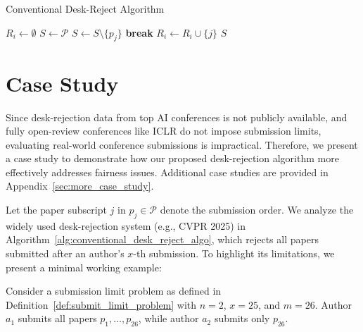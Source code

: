 \begin{algorithm}[!ht]
\caption{Conventional Desk-Reject Algorithm}
\label{alg:conventional_desk_reject_algo}
\begin{algorithmic}[1]

\State $R_i \gets \emptyset$
\EndFor
{}
\State $S \gets \mathcal{P}$
\State $S \gets S \setminus \{p_j\}$
\State \textbf{break}
\EndIf
\EndFor
{}
\State $R_i \gets R_i \cup \{ j \}$
\EndFor
\EndIf
\EndFor
\State \Return $S$
\EndProcedure
\end{algorithmic}
\end{algorithm}

\section{Case Study}\label{sec:case_study}

Since desk-rejection data from top AI conferences is not publicly available, and fully open-review conferences like ICLR do not impose submission limits, evaluating real-world conference submissions is impractical. Therefore, we present a case study to demonstrate how our proposed desk-rejection algorithm more effectively addresses fairness issues. Additional case studies are provided in Appendix~\ref{sec:more_case_study}.


Let the paper subscript $j$ in $p_j \in \mathcal{P}$ denote the submission order. We analyze the widely used desk-rejection system (e.g., CVPR 2025) in Algorithm~\ref{alg:conventional_desk_reject_algo}, which rejects all papers submitted after an author’s $x$-th submission. To highlight its limitations, we present a minimal working example:

\begin{example}
    Consider a submission limit problem as defined in Definition~\ref{def:submit_limit_problem} with $n=2$, $x=25$, and $m=26$. Author $a_1$ submits all papers $p_1, \ldots, p_{26}$, while author $a_2$ submits only $p_{26}$.
\end{example}

